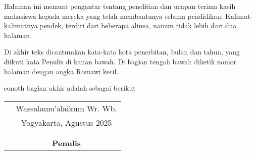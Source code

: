 
\makeatletter
\vspace*{1cm}

Halaman ini memuat pengantar tentang penelitian dan ucapan terima kasih mahasiswa kepada mereka yang telah membantunya selama pendidikan. Kalimat- kalimatnya pendek, terdiri dari beberapa alinea, namun tidak lebih dari dua halaman.

Di akhir teks dicantumkan kata-kata kota penerbitan, bulan dan tahun, yang diikuti kata Penulis di kanan bawah. Di bagian tengah bawah diketik nomor halaman dengan angka Romawi kecil.

conoth bagian akhir adalah sebagai berikut 

\vspace{1cm}
\begin{tabular}{p{7.5cm}c}
	&Wassalamu'alaikum Wr. Wb.\\
	&Yogyakarta, Agustus 2025\\
	&\\&\\
	&\textbf{Penulis}
\end{tabular}